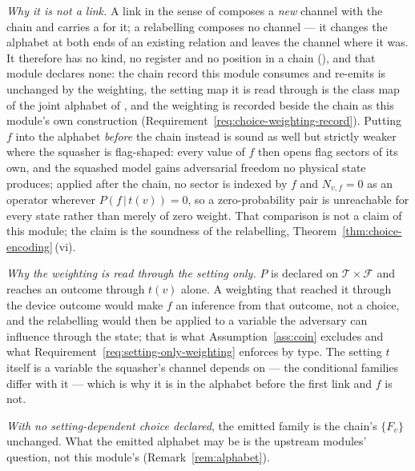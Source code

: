 \begin{remark}
\emph{Why it is not a link.} A link in the sense of
 composes a \emph{new} channel with the chain and
carries a  for it; a relabelling composes no channel
--- it changes the alphabet at both ends of an existing relation and leaves
the channel where it was. It therefore has no kind, no register and no
position in a chain (), and that module declares
none: the chain record this module consumes and re-emits is unchanged by the
weighting, the setting map it is read through is the class map of the joint
alphabet of , and the weighting is recorded
beside the chain as this module's own construction
(Requirement~\ref{req:choice-weighting-record}). Putting $f$ into the alphabet
\emph{before} the chain instead is sound as well but strictly weaker where
the squasher is flag-shaped: every value of $f$ then opens flag sectors of its
own, and the squashed model gains adversarial freedom no physical state
produces; applied after the chain, no sector is indexed by $f$ and
$N_{v,f}=0$ as an operator wherever $P(f\,|\,t(v))=0$, so a zero-probability
pair is unreachable for every state rather than merely of zero weight. That
comparison is not a claim of this module; the claim is the soundness of the
relabelling, Theorem~\ref{thm:choice-encoding}\,(vi).

\emph{Why the weighting is read through the setting only.} $P$ is declared on
$\mathcal{T}\times\mathcal{F}$ and reaches an outcome through $t(v)$ alone.
A weighting that reached it through the device outcome would make $f$ an
inference from that outcome, not a choice, and the relabelling would then be
applied to a variable the adversary can influence through the state; that is
what Assumption~\ref{ass:coin} excludes and what
Requirement~\ref{req:setting-only-weighting} enforces by type. The setting
$t$ itself is a variable the squasher's channel depends on --- the conditional
families differ with it --- which is why it is in the alphabet before the
first link and $f$ is not.

\emph{With no setting-dependent choice declared}, the emitted family is the
chain's $\{F_v\}$ unchanged. What the emitted alphabet may be is the upstream
modules' question, not this module's (Remark~\ref{rem:alphabet}).
\end{remark}
